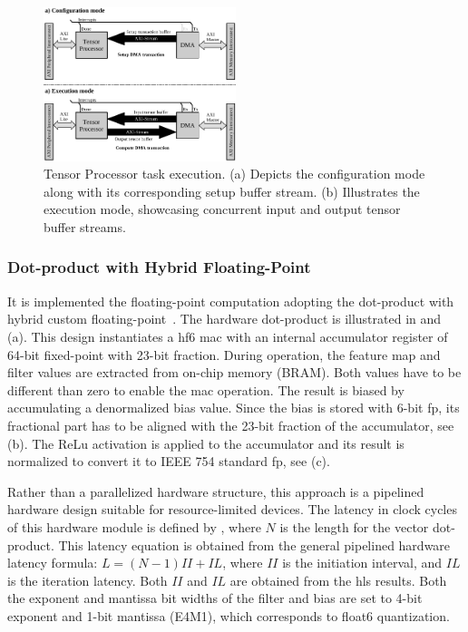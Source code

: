 \begin{figure}[h!]
	\centering
	\includegraphics[width=0.5\textwidth]{./figures/task_execution.pdf}
	\caption{Tensor Processor task execution. (a) Depicts the configuration mode along with its corresponding setup buffer stream. (b) Illustrates the execution mode, showcasing concurrent input and output tensor buffer streams.}
	\label{fig:sw_tp_delegate_job_chapter}
\end{figure}


\FloatBarrier
\subsubsection{Dot-product with Hybrid Floating-Point}
\label{sec:dot_product}
It is implemented the floating-point computation adopting the dot-product with hybrid custom floating-point~\cite{nevarez2021accelerating}. The hardware dot-product is illustrated in  and (a). This design instantiates a \gls{hf6} \gls{mac} with an internal accumulator register of 64-bit fixed-point with 23-bit fraction. During operation, the feature map and filter values are extracted from on-chip memory (BRAM). Both values have to be different than zero to enable the \gls{mac} operation. The result is biased by accumulating a denormalized bias value. Since the bias is stored with 6-bit \gls{fp}, its fractional part has to be aligned with the 23-bit fraction of the accumulator, see (b). The ReLu activation is applied to the accumulator and its result is normalized to convert it to IEEE 754 standard \gls{fp}, see (c).

Rather than a parallelized hardware structure, this approach is a pipelined hardware design suitable for resource-limited devices. The latency in clock cycles of this hardware module is defined by , where $N$ is the length for the vector dot-product. This latency equation is obtained from the general pipelined hardware latency formula: $L=\left(N-1\right)II+IL$, where $II$ is the initiation interval, and $IL$ is the iteration latency. Both $II$ and $IL$ are obtained from the \gls{hls} results. Both the exponent and mantissa bit widths of the filter and bias are set to 4-bit exponent and 1-bit mantissa (E4M1), which corresponds to float6 quantization.

